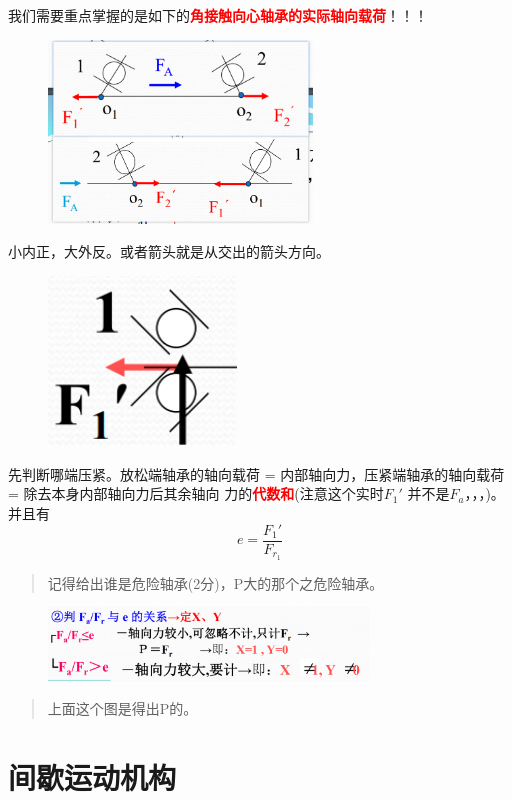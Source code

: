\documentclass[twocolumn]{ctexart}
\begin{document}
我们需要重点掌握的是如下的\textcolor{red}{\textbf{角接触向心轴承的实际轴向载荷}}！！！
        \begin{figure}[H]
            \centering
            \includegraphics[width=7cm]{img/12.png}
            \end{figure}
小内正，大外反。或者箭头就是从交出的箭头方向。
        \begin{figure}[H]
            \centering
            \includegraphics[width=5cm]{img/14.png}
            \end{figure}
先判断哪端压紧。放松端轴承的轴向载荷 = 内部轴向力，压紧端轴承的轴向载荷 = 除去本身内部轴向力后其余轴向
力的\textcolor{red}{\textbf{代数和}}(注意这个实时$F_1'$ 并不是$F_a$，，，)。并且有
$$
e=\frac{F_1'}{F_{r_1}}
$$
\begin{quote}
{\qquad{}\ccwd\kaishu{}
记得给出谁是危险轴承(2分)，P大的那个之危险轴承。
}
\end{quote}
\begin{figure}[H]
            \centering
            \includegraphics[width=8.5cm]{img/13.png}
            \end{figure}
            \begin{quote}
            {\qquad{}\ccwd\kaishu{}
            上面这个图是得出P的。
            }
            \end{quote}
\section{间歇运动机构}
\end{document}
